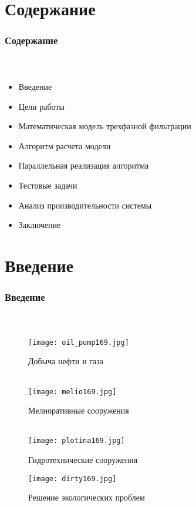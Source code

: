 \section{Содержание}

\begin{frame}
\begin{center}
\frametitle{Содержание}
\framesubtitle{\ }
\begin{itemize}
\item {\large Введение}
\vspace{0.3cm}
\item {\large Цели работы}
\vspace{0.3cm}
\item {\large Математическая модель трехфазной фильтрации}
\vspace{0.3cm}
\item {\large Алгоритм расчета модели}
\vspace{0.3cm}
\item {\large Параллельная реализация алгоритма}
\vspace{0.3cm}
\item {\large Тестовые задачи}
\vspace{0.3cm}
\item {\large Анализ производительности системы}
\vspace{0.3cm}
\item {\large Заключение}
\end{itemize}
\end{center}
\end{frame}

\section{Введение}

\begin{frame}
\begin{center}
\frametitle{Введение}
\framesubtitle{\ }
\begin{figure}
\begin{minipage}[h]{0.43\textwidth}
\texttt{[image: oil\_pump169.jpg]}
\caption{\small{Добыча нефти и газа\\ \ }}
\end{minipage}
\hspace{8mm}
\begin{minipage}[h]{0.43\textwidth}
\texttt{[image: melio169.jpg]}
\caption{\small{Мелиоративные сооружения\\ \ }}
\end{minipage}
\vfill
\begin{minipage}[h]{0.43\textwidth}
\texttt{[image: plotina169.jpg]}
\caption{\small{Гидротехнические сооружения}}
\end{minipage}
\hspace{8mm}
\begin{minipage}[h]{0.43\textwidth}
\texttt{[image: dirty169.jpg]}
\caption{\small{Решение экологических проблем}}
\end{minipage}
\end{figure}
\end{center}
\end{frame}


